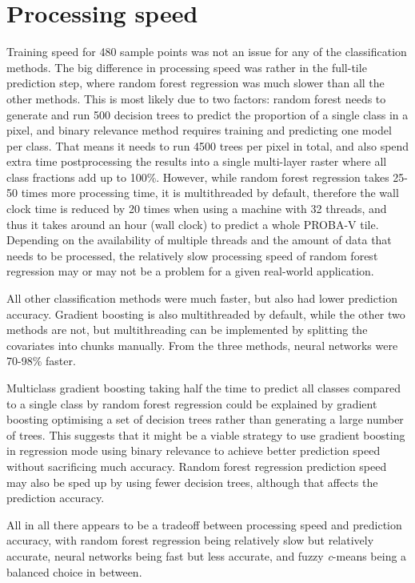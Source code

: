 \documentclass[a4paper,10pt]{book}
\begin{document}
\section{Processing speed}

Training speed for 480 sample points was not an issue for any of the classification methods. The big difference in processing speed was rather in the full-tile prediction step, where random forest regression was much slower than all the other methods. This is most likely due to two factors: random forest needs to generate and run 500 decision trees to predict the proportion of a single class in a pixel, and binary relevance method requires training and predicting one model per class. That means it needs to run 4500 trees per pixel in total, and also spend extra time postprocessing the results into a single multi-layer raster where all class fractions add up to 100\%. However, while random forest regression takes 25-50 times more processing time, it is multithreaded by default, therefore the wall clock time is reduced by 20 times when using a machine with 32 threads, and thus it takes around an hour (wall clock) to predict a whole PROBA-V tile. Depending on the availability of multiple threads and the amount of data that needs to be processed, the relatively slow processing speed of random forest regression may or may not be a problem for a given real-world application.

All other classification methods were much faster, but also had lower prediction accuracy. Gradient boosting is also multithreaded by default, while the other two methods are not, but multithreading can be implemented by splitting the covariates into chunks manually. From the three methods, neural networks were 70-98\% faster.

Multiclass gradient boosting taking half the time to predict all classes compared to a single class by random forest regression could be explained by gradient boosting optimising a set of decision trees rather than generating a large number of trees. This suggests that it might be a viable strategy to use gradient boosting in regression mode using binary relevance to achieve better prediction speed without sacrificing much accuracy. Random forest regression prediction speed may also be sped up by using fewer decision trees, although that affects the prediction accuracy.

All in all there appears to be a tradeoff between processing speed and prediction accuracy, with random forest regression being relatively slow but relatively accurate, neural networks being fast but less accurate, and fuzzy \textit{c}-means being a balanced choice in between.
\end{document}
